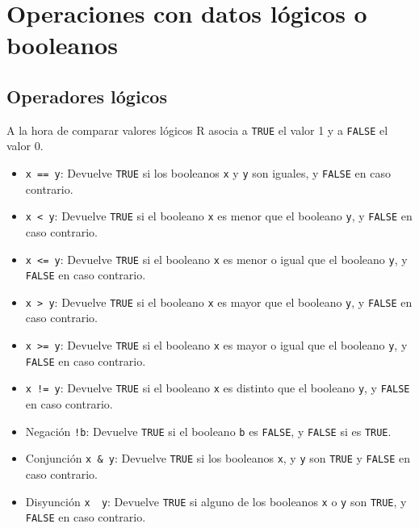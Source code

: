 \documentclass[
  a4paper,
]{scrreport}
\providecommand{\tightlist}{%
  \setlength{\itemsep}{0pt}\setlength{\parskip}{0pt}}\usepackage{longtable,booktabs,array}
\theoremstyle{definition}
\theoremstyle{definition}
\theoremstyle{remark}
\begin{document}
\hypertarget{operaciones-con-datos-luxf3gicos-o-booleanos}{%
\section{Operaciones con datos lógicos o
booleanos}\label{operaciones-con-datos-luxf3gicos-o-booleanos}}

\hypertarget{operadores-luxf3gicos}{%
\subsection{Operadores lógicos}\label{operadores-luxf3gicos}}

A la hora de comparar valores lógicos R asocia a \texttt{TRUE} el valor
1 y a \texttt{FALSE} el valor 0.

\begin{itemize}
\tightlist
\item
  \texttt{x\ ==\ y}: Devuelve \texttt{TRUE} si los booleanos \texttt{x}
  y \texttt{y} son iguales, y \texttt{FALSE} en caso contrario.
\item
  \texttt{x\ \textless{}\ y}: Devuelve \texttt{TRUE} si el booleano
  \texttt{x} es menor que el booleano \texttt{y}, y \texttt{FALSE} en
  caso contrario.
\item
  \texttt{x\ \textless{}=\ y}: Devuelve \texttt{TRUE} si el booleano
  \texttt{x} es menor o igual que el booleano \texttt{y}, y
  \texttt{FALSE} en caso contrario.
\item
  \texttt{x\ \textgreater{}\ y}: Devuelve \texttt{TRUE} si el booleano
  \texttt{x} es mayor que el booleano \texttt{y}, y \texttt{FALSE} en
  caso contrario.
\item
  \texttt{x\ \textgreater{}=\ y}: Devuelve \texttt{TRUE} si el booleano
  \texttt{x} es mayor o igual que el booleano \texttt{y}, y
  \texttt{FALSE} en caso contrario.
\item
  \texttt{x\ !=\ y}: Devuelve \texttt{TRUE} si el booleano \texttt{x} es
  distinto que el booleano \texttt{y}, y \texttt{FALSE} en caso
  contrario.
\item
  Negación \texttt{!b}: Devuelve \texttt{TRUE} si el booleano \texttt{b}
  es \texttt{FALSE}, y \texttt{FALSE} si es \texttt{TRUE}.
\item
  Conjunción \texttt{x\ \&\ y}: Devuelve \texttt{TRUE} si los booleanos
  \texttt{x}, y \texttt{y} son \texttt{TRUE} y \texttt{FALSE} en caso
  contrario.
\item
  Disyunción \texttt{x\ \textbar{}\ y}: Devuelve \texttt{TRUE} si alguno
  de los booleanos \texttt{x} o \texttt{y} son \texttt{TRUE}, y
  \texttt{FALSE} en caso contrario.
\end{itemize}
\end{document}
